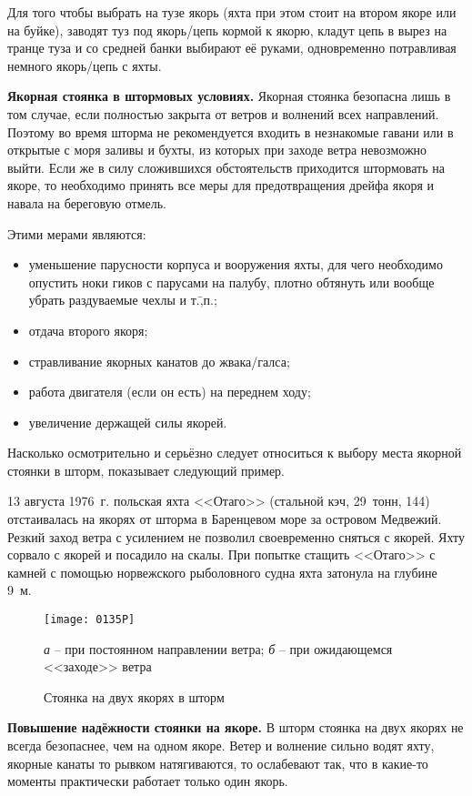 Для того чтобы выбрать на тузе якорь (яхта при этом стоит на втором
якоре или на буйке), заводят туз под якорь\-/цепь кормой к якорю,
кладут цепь в вырез на транце туза и со средней банки выбирают её
руками, одновременно потравливая немного якорь\-/цепь с яхты.

\textbf{Якорная стоянка в штормовых условиях.} Якорная стоянка
безопасна лишь в том случае, если полностью закрыта от ветров и
волнений всех направлений. Поэтому во время шторма не рекомендуется
входить в незнакомые гавани или в открытые с моря заливы и бухты, из
которых при заходе ветра невозможно выйти. Если же в силу сложившихся
обстоятельств приходится штормовать на якоре, то необходимо принять
все меры для предотвращения дрейфа якоря и навала на береговую отмель.

Этими мерами являются: 
\begin{itemize}
\item уменьшение парусности корпуса и вооружения яхты, для чего
  необходимо опустить ноки гиков с парусами на палубу, плотно обтянуть
  или вообще убрать раздуваемые чехлы и т.\=,п.;
\item отдача второго якоря; 
\item стравливание якорных канатов до жвака\-/галса; 
\item работа двигателя (если он есть) на переднем ходу; 
\item увеличение держащей силы якорей. 
\end{itemize}

Насколько осмотрительно и серьёзно следует относиться к выбору места
якорной стоянки в шторм, показывает следующий пример.

{\small 13 августа 1976~г. польская яхта <<Отаго>> (стальной кэч,
  29~тонн, 144\msq) отстаивалась на якорях от шторма в Баренцевом море
  за островом Медвежий. Резкий заход ветра с усилением не позволил
  своевременно сняться с якорей. Яхту сорвало с якорей и посадило на
  скалы. При попытке стащить <<Отаго>> с камней с помощью норвежского
  рыболовного судна яхта затонула на глубине 9~м.}

\begin{figure*}[htb]
  \centering{}
  \texttt{[image: 0135P]}
  \caption{Стоянка на двух якорях в шторм}
  \label{fig:135}
  \small
  \centering{}
  \textit{а} \--- при постоянном направлении ветра; \textit{б} \--- при ожидающемся <<заходе>> ветра
\end{figure*}

\textbf{Повышение надёжности стоянки на якоре.} В шторм стоянка на
двух якорях не всегда безопаснее, чем на одном якоре. Ветер и волнение
сильно водят яхту, якорные канаты то рывком натягиваются, то
ослабевают так, что в какие-то моменты практически работает только
один якорь.

